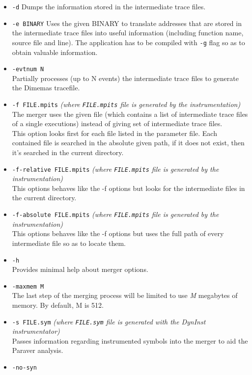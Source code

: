 \begin{itemize}
 \item {\tt -d}
 Dumps the information stored in the intermediate trace files.
 \item {\tt -e BINARY}
 Uses the given BINARY to translate addresses that are stored in the intermediate trace files into useful information (including function name, source file and line). The application has to be compiled with {\tt -g} flag so as to obtain valuable information.
 \item {\tt -evtnum N}\\
 Partially processes (up to N events) the intermediate trace files to generate the Dimemas tracefile.
 \item {\tt -f FILE.mpits} {\em (where {\tt FILE.mpits} file is generated by the instrumentation)}\\
 The merger uses the given file (which contains a list of intermediate trace files of a single executions) instead of giving set of intermediate trace files.\\
 This option looks first for each file listed in the parameter file. Each contained file is searched in the absolute given path, if it does not exist, then it's searched in the current directory.
 \item {\tt -f-relative FILE.mpits} {\em (where {\tt FILE.mpits} file is generated by the instrumentation)}\\
 This options behaves like the -f options but looks for the intermediate files in the current directory.
 \item {\tt -f-absolute FILE.mpits} {\em (where {\tt FILE.mpits} file is generated by the instrumentation)}\\
 This options behaves like the -f options but uses the full path of every intermediate file so as to locate them.
 \item {\tt -h}\\
 Provides minimal help about merger options.
 \item {\tt -maxmem M}\\
 The last step of the merging process will be limited to use {\em M} megabytes of memory. By default, M is 512.
 \item {\tt -s FILE.sym} {\em (where {\tt FILE.sym} file is generated with the DynInst instrumentator)}\\
 Passes information regarding instrumented symbols into the merger to aid the Paraver analysis.
 \item {\tt -no-syn}\\

\end{itemize}
